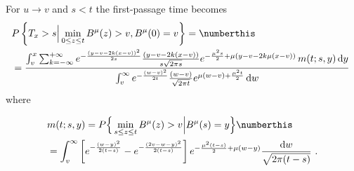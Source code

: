 %
For  $  u \to v $ and $ s < t $ the first-passage time becomes
%
%
\begin{align*}
&
	P\left\{ T_x > s \Big| \min_{ 0 \leq z \leq t }B^\mu( z) > v, B^\mu(0) = v \right\} =
	\numberthis \label{eq:first-psg-dist-v}
	\\
	&=
		\frac{ 
	\int_v^x \sum_{k = - \infty}^{+\infty}
	e^{    -   \frac{(y - v - 2k(x-v))^2}{2 s} } 
	\frac { (y - v - 2k (x-v) )}{s\sqrt{2 \pi s }}
	e^{ - \frac {\mu^2 s } 2 + \mu( y-v - 2 k \mu (x-v) ) }
	\,   
%
		m(t;s,y) \,\mathrm d y
	}{
		\int_v^\infty 
		e^{  - \frac{(w-v)^2}{2t}  } 
		\frac{ (w-v)  }{\sqrt{2 \pi t} }
		e^{ \mu (w-v) + \frac{\mu^2 t}{2}   } \,  \mathrm d w
	} \,\,
\end{align*}
%
%
where 
%

\begin{align*} 
	&
	m(t;s,y) = 
 	P\Big\{   \min_{s \leq z \leq t} B^\mu(z)   > v  \Big | B^\mu ( s) = y \Big\}
 	\numberthis \\
 	&=
 	\int_v^\infty 
 	\left[ 
 	e^{  - \frac{(w-y)^2}{2(t-s)}  } 
 	- 
 	e^{  - \frac{(2v - w-y)^2}{2(t-s)}  } 
 	\right]
 	e^{  - \frac{\mu^2 (t-s)}{2} + \mu ( w - y) }  \frac{\mathrm d w}{\sqrt{2\pi(t-s)}} \,\, .
\end{align*}


